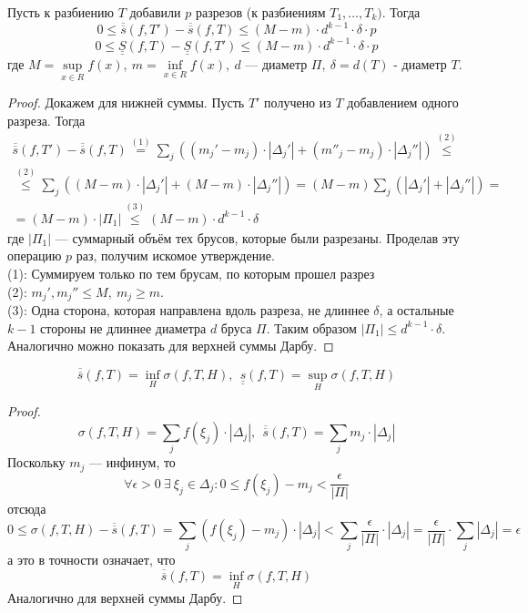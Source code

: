 \begin{statement} \label{razrezy}
        Пусть к разбиению $T$ добавили $p$ разрезов (к разбиениям $T_1,\dots,T_k)$. Тогда 
        \[0\leq \overline{\overline{s}}(f,T')-\overline{\overline{s}}(f,T)\leq (M-m)\cdot d^{k-1}\cdot \delta\cdot p\]
        \[0\leq \underline{\underline{S}}(f,T)-\underline{\underline{S}}(f,T')\leq(M-m)\cdot d^{k-1}\cdot \delta\cdot p\]
        где $M=\sup\limits_{x\in R}f(x),\ m=\inf\limits_{x\in R}f(x),\ d$ --- диаметр $\Pi,\ \delta=d(T)$ - диаметр $T$.
\end{statement}
\begin{proof} Докажем для нижней суммы. Пусть $T'$ получено из $T$ добавлением одного разреза. Тогда
    \begin{multline*}
        \overline{\overline{s}}(f,T')-\overline{\overline{s}}(f,T)\overset{(1)}{=}\sum\limits_{j}((m_j'-m_j)\cdot |\Delta_j'|+(m''_j-m_j)\cdot |\Delta_j''|)\overset{(2)}{\leq}\\
        \overset{(2)}{\leq} \sum\limits_{j} ((M-m)\cdot |\Delta_j'|+(M-m)\cdot |\Delta_j''|)=(M-m)\sum\limits_{j}(|\Delta_j'|+|\Delta_j''|)=\\
        =(M-m)\cdot |\Pi_1|\overset{(3)}{\leq} (M-m)\cdot d^{k-1}\cdot \delta
    \end{multline*}
    где $|\Pi_1|$ --- суммарный объём тех брусов, которые были разрезаны. Проделав эту операцию $p$ раз, получим искомое утверждение.\\
    (1): Суммируем только по тем брусам, по которым прошел разрез\\
    (2): $m_j', m_j''\leq M,\ m_j\geq m$.\\
    (3): Одна сторона, которая направлена вдоль разреза, не длиннее $\delta$, а остальные $k-1$ стороны не длиннее диаметра $d$ бруса $\Pi$. Таким образом $|\Pi_1|\leq d^{k-1}\cdot \delta$. \\
    Аналогично можно показать для верхней суммы Дарбу.
\end{proof}
\begin{statement}
    \[\overline{\overline{s}}(f,T)=\inf\limits_H\sigma(f,T,H),\ \ \underline{\underline{s}}(f,T)=\sup\limits_H\sigma(f,T,H)\]
\end{statement}
\begin{proof}
    \[\sigma(f,T,H)=\sum\limits_{j}f(\xi_j)\cdot |\Delta_j|,\ \ \overline{\overline{s}}(f,T)=\sum\limits_{j} m_j\cdot |\Delta_j|\]
    Поскольку $m_j$ --- инфинум, то
    \[\forall \epsilon>0\ \exists\ \xi_j\in \Delta_j: 0\leq f(\xi_j)-m_j<\frac{\epsilon}{|\Pi|}\]
    отсюда
    \[0\leq \sigma(f,T,H)-\overline{\overline{s}}(f,T)=\sum\limits_{j}(f(\xi_j)-m_j)\cdot |\Delta_j|<\sum\limits_{j}\frac{\epsilon}{|\Pi|}\cdot |\Delta_j|=\frac{\epsilon}{|\Pi|}\cdot \sum\limits_{j}|\Delta_j|=\epsilon\]
    а это в точности означает, что
    \[\overline{\overline{s}}(f,T)=\inf\limits_H\sigma(f,T,H)\]
    Аналогично для верхней суммы Дарбу.
\end{proof}
